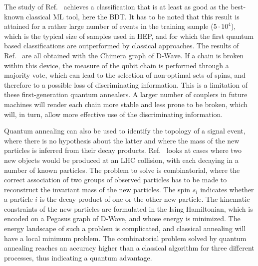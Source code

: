 The study of Ref.~\cite{Bargassa2021} achieves a classification that is at least as good as the best-known classical ML tool, here the BDT. It has to be noted that this result is attained for a rather large number of events in the training sample ($5\cdot10^4$), which is the typical size of samples used in HEP, and for which the first quantum based classifications are outperformed by classical approaches.
The results of Ref.~\cite{Mott2017,qamlz,Bargassa2021} are all obtained with the Chimera graph of D-Wave.
If a chain is broken within this device, the measure of the qubit chain is performed through a majority vote, which can lead to the selection of non-optimal sets of spins, and therefore to a possible loss of discriminating information.
This is a limitation of these first-generation quantum annealers.
A larger number of couplers in future machines will render each chain more stable and less prone to be broken, which will, in turn, allow more effective use of the discriminating information.

Quantum annealing can also be used to identify the topology of a signal event, where there is no hypothesis about the latter and where the mass of the new particles is inferred from their decay products.
Ref.~\cite{kim2021} looks at cases where two new objects would be produced at an LHC collision, with each decaying in a number of known particles.
The problem to solve is combinatorial, where the correct association of two groups of observed particles has to be made to reconstruct the invariant mass of the new particles.
The spin $s_i$ indicates whether a particle $i$ is the decay product of one or the other new particle.
The kinematic constraints of the new particles are formulated in the Ising Hamiltonian, which is encoded on a Pegasus graph of D-Wave, and whose energy is minimized.
The energy landscape of such a problem is complicated, and classical annealing will have a local minimum problem.
The combinatorial problem solved by quantum annealing reaches an accuracy higher than a classical algorithm for three different processes, thus indicating a quantum advantage.

